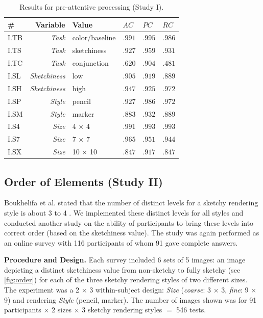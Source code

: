 \begin{table}[h!]%
	\caption{Results for pre-attentive processing (Study I).}
	\vspace{-0.5\baselineskip}
	\renewcommand{\arraystretch}{1.618}
	\label{tab:study1-results}
	\centering
	\small
	\begin{tabular}{lrl|lll}
		\# & \bfseries Variable & \bfseries Value & $\mathit{AC}$ & $\mathit{PC}$ & $\mathit{RC}$ \\
		\hline\hline
		I.TB 	& \textsl{Task}			& color/baseline 	& $.991$ & $.995$ & $.986$ \\
		I.TS 	& \textsl{Task}			& sketchiness 		& $.927$ & $.959$ & $.931$ \\
		I.TC 	& \textsl{Task}			& conjunction 		& $.620$ & $.904$ & $.481$ \\
		I.SL 	& \textsl{Sketchiness}	& low 				& $.905$ & $.919$ & $.889$ \\
		I.SH 	& \textsl{Sketchiness}	& high 				& $.947$ & $.925$ & $.972$ \\
		I.SP 	& \textsl{Style}		& pencil 			& $.927$ & $.986$ & $.972$ \\
		I.SM 	& \textsl{Style} 		& marker 			& $.883$ & $.932$ & $.889$ \\
		I.S4	& \textsl{Size} 		& 4 $\times$ 4		& $.991$ & $.993$ & $.993$ \\
		I.S7	& \textsl{Size} 		& 7 $\times$ 7		& $.965$ & $.951$ & $.944$ \\
		I.SX 	& \textsl{Size}			& 10 $\times$ 10 	& $.847$ & $.917$ & $.847$
	\end{tabular}
	
\end{table}

\subsection{Order of Elements (Study II)}
\label{sec:order}

\noindent
Boukhelifa et al. stated that the number of distinct levels for a sketchy rendering style is about 3 to 4 \cite{Boukhelifa2012}.
We implemented these distinct levels for all styles and conducted another study on the ability of participants to bring these levels into correct order (based on the sketchiness value).
The study was again performed as an online survey with 116 participants of whom 91 gave complete answers.

\textbf{Procedure and Design.}
Each survey included 6 sets of 5 images: an image depicting a distinct sketchiness value from non-sketchy to fully sketchy (see \autoref{fig:order}) for each of the three sketchy rendering styles of two different sizes.
The experiment was a 2 $ \times $ 3 within-subject design: 
\textsl{Size} (\emph{coarse}: 3 $ \times $ 3, \emph{fine}: 9 $ \times $ 9)
and rendering \textsl{Style} (pencil, marker). 
The number of images shown was for 91 participants $ \times $ 2 sizes $ \times $ 3 sketchy rendering styles $ = $ 546 tests.

